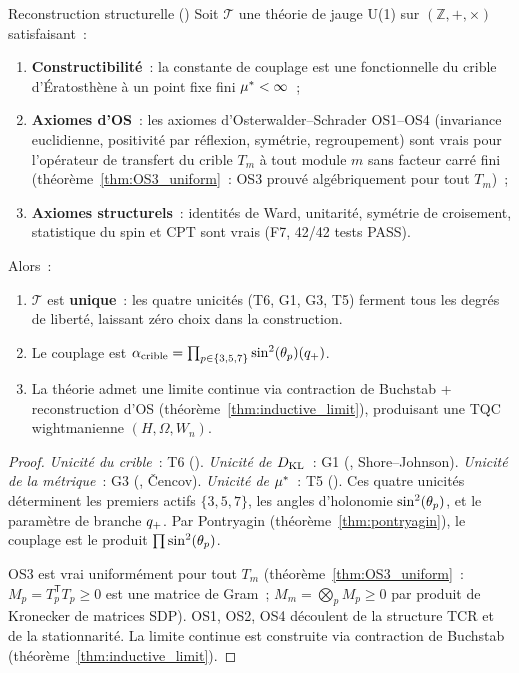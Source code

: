 \documentclass[12pt,a4paper]{article}
\begin{document}
\begin{thmbox}{Reconstruction structurelle (\THMTAG)}\mTHM
\label{thm:structural_reconstruction}
Soit $\mathcal{T}$ une théorie de jauge U(1) sur
$(\mathbb{Z}, +, \times)$ satisfaisant~:
\begin{enumerate}[nosep, label=\textbf{(SR\arabic*)}]
\item \textbf{Constructibilité}~: la constante de couplage est une
  fonctionnelle du crible d'Ératosthène à un point fixe fini
  ${\mu^{*}} < \infty$~;
\item \textbf{Axiomes d'OS}~: les axiomes d'Osterwalder--Schrader
  OS1--OS4 (invariance euclidienne, positivité par réflexion,
  symétrie, regroupement) sont vrais pour l'opérateur de transfert
  du crible $T_m$ à tout module $m$ sans facteur carré fini
  (théorème~\ref{thm:OS3_uniform}~: OS3 prouvé algébriquement pour
  tout $T_m$)~;
\item \textbf{Axiomes structurels}~: identités de Ward, unitarité,
  symétrie de croisement, statistique du spin et CPT sont vrais
  (F7, 42/42 tests PASS).
\end{enumerate}
Alors~:
\begin{enumerate}[nosep, label=(\roman*)]
\item $\mathcal{T}$ est \textbf{unique}~: les quatre unicités (T6,
  G1, G3, T5) ferment tous les degrés de liberté, laissant zéro
  choix dans la construction.
\item Le couplage est
  $\alpha_{\rm crible} = \prod_{p \in \{3,5,7\}} \sin^2(\theta_{p})(q_{+})$.
\item La théorie admet une limite continue via contraction de
  Buchstab + reconstruction d'OS
  (théorème~\ref{thm:inductive_limit}), produisant une TQC
  wightmanienne $(H, \Omega, W_n)$.
\end{enumerate}
\begin{proof}
\emph{Unicité du crible}~: T6 (\cite{companion_M2}).
\emph{Unicité de $D_{\mathrm{KL}}$}~: G1 (\cite{companion_M2}, Shore--Johnson).
\emph{Unicité de la métrique}~: G3 (\cite{companion_M2}, \v{C}encov).
\emph{Unicité de ${\mu^{*}}$}~: T5 (\cite{companion_M3}).
Ces quatre unicités déterminent les premiers actifs $\{3,5,7\}$,
les angles d'holonomie $\sin^2(\theta_{p})$, et le paramètre de branche
$q_{+}$. Par Pontryagin (théorème~\ref{thm:pontryagin}), le
couplage est le produit $\prod \sin^2(\theta_{p})$.

OS3 est vrai uniformément pour tout $T_m$
(théorème~\ref{thm:OS3_uniform}~:
$M_p = T_p^{\mathsf{T}} T_p \geq 0$ est une matrice de Gram~;
$M_m = \bigotimes_p M_p \geq 0$ par produit de Kronecker de matrices
SDP). OS1, OS2, OS4 découlent de la structure TCR et de la
stationnarité. La limite continue est construite via contraction de
Buchstab (théorème~\ref{thm:inductive_limit}).
\end{proof}
\end{thmbox}
\end{document}
